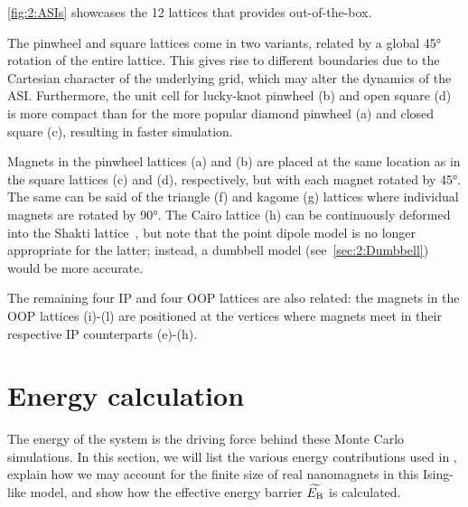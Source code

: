 
\cref{fig:2:ASIs} showcases the 12 lattices that \hotspice provides out-of-the-box. \par
The pinwheel and square lattices come in two variants, related by a global \ang{45} rotation of the entire lattice.
This gives rise to different boundaries due to the Cartesian character of the underlying grid, which may alter the dynamics of the ASI.
Furthermore, the unit cell for lucky-knot pinwheel (b) and open square (d) is more compact than for the more popular diamond pinwheel (a) and closed square (c), resulting in faster simulation. \par %
Magnets in the pinwheel lattices (a) and (b) are placed at the same location as in the square lattices (c) and (d), respectively, but with each magnet rotated by \ang{45}.
The same can be said of the triangle (f) and kagome (g) lattices where individual magnets are rotated by \ang{90}.
The Cairo lattice (h) can be continuously deformed into the Shakti lattice~\cite{ShaktiCairo}, but note that the point dipole model is no longer appropriate for the latter; instead, a dumbbell model (see~\cref{sec:2:Dumbbell}) would be more accurate. \par
The remaining four IP and four OOP lattices are also related: the magnets in the OOP lattices (i)-(l) are positioned at the vertices where magnets meet in their respective IP counterparts (e)-(h).

\section{Energy calculation}
The energy of the system is the driving force behind these Monte Carlo simulations.
In this section, we will list the various energy contributions used in \hotspice, explain how we may account for the finite size of real nanomagnets in this Ising-like model, and show how the effective energy barrier $\widetilde{E_\mathrm{B}}$ is calculated.

